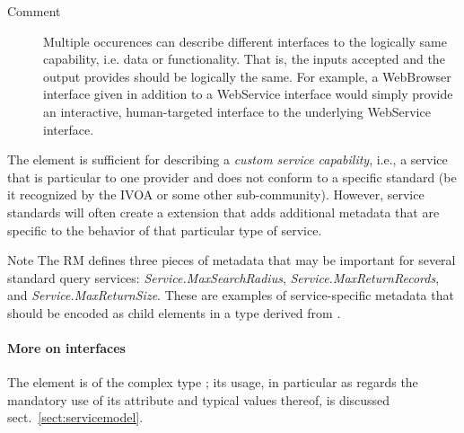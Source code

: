 \documentclass[11pt,a4paper]{ivoa}
\begin{document}
\begin{generated}
\begin{bigdescription}
\begin{description}
\item[Comment]
                  Multiple occurences can describe different interfaces to
                  the logically same capability, i.e. data or functionality.
                  That is, the inputs accepted and the output provides should
                  be logically the same.  For example, a WebBrowser interface
                  given in addition to a WebService interface would simply
                  provide an interactive, human-targeted interface to the
                  underlying WebService interface.


\end{description}


\end{bigdescription}\endgroup

\endgroup
\end{generated}



The  element is sufficient for describing a
\emph{custom service capability}, i.e., a service that is
particular to one provider and does not conform to a specific standard
(be it recognized by the IVOA or some other sub-community).  However,
service standards will often create a 
extension that adds additional metadata that are specific
to the behavior of that particular type of service.



\begin{admonition}{Note}
The RM defines three pieces of metadata that may be
important for several standard query services:
\emph{Service.MaxSearchRadius},
\emph{Service.MaxReturnRecords}, and
\emph{Service.MaxReturnSize}.  These are examples of
service-specific metadata that should be encoded as child
elements in a type derived from .
\end{admonition}

\paragraph{More on interfaces}

The  element is of the complex type
; its usage, in particular as regards the mandatory
use of its  attribute and typical values thereof, is
discussed sect.~\ref{sect:servicemodel}.
\end{document}
